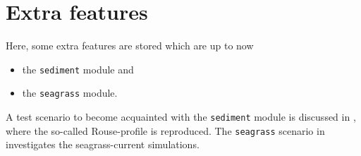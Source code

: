 %
%

\section{Extra features \label{sec:extra}}

Here, some extra features are stored which are up to now

\begin{itemize}
\item the {\tt sediment} module and
\item the {\tt seagrass} module.
\end{itemize}

A test scenario to become acquainted with the {\tt sediment} module
is discussed in , where the so-called Rouse-profile
is reproduced. The {\tt seagrass} scenario in  
investigates the \cite{VerduinBackhaus2000} seagrass-current
simulations. 
